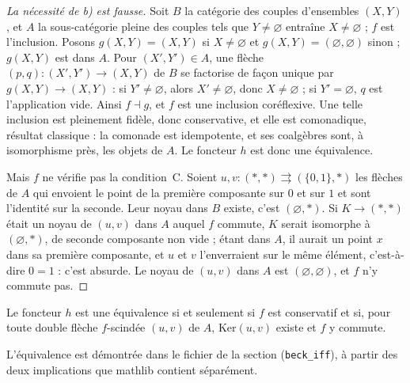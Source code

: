 \begin{proof}[La nécessité de b) est fausse]
Soit $B$ la catégorie des couples d'ensembles $(X, Y)$, et $A$ la sous-catégorie pleine des couples tels que $Y \neq \varnothing$ entraîne $X \neq \varnothing$ ; $f$ est l'inclusion. Posons $g(X, Y) = (X, Y)$ si $X \neq \varnothing$ et $g(X, Y) = (\varnothing, \varnothing)$ sinon ; $g(X, Y)$ est dans $A$. Pour $(X', Y') \in A$, une flèche $(p, q) : (X', Y') \to (X, Y)$ de $B$ se factorise de façon unique par $g(X, Y) \to (X, Y)$ : si $Y' \neq \varnothing$, alors $X' \neq \varnothing$, donc $X \neq \varnothing$ ; si $Y' = \varnothing$, $q$ est l'application vide. Ainsi $f \dashv g$, et $f$ est une inclusion coréflexive. Une telle inclusion est pleinement fidèle, donc conservative, et elle est comonadique, résultat classique : la comonade est idempotente, et ses coalgèbres sont, à isomorphisme près, les objets de $A$. Le foncteur $h$ est donc une équivalence.

Mais $f$ ne vérifie pas la condition~C. Soient $u, v : (\ast, \ast) \rightrightarrows (\{0, 1\}, \ast)$ les flèches de $A$ qui envoient le point de la première composante sur $0$ et sur $1$ et sont l'identité sur la seconde. Leur noyau dans $B$ existe, c'est $(\varnothing, \ast)$. Si $K \to (\ast, \ast)$ était un noyau de $(u, v)$ dans $A$ auquel $f$ commute, $K$ serait isomorphe à $(\varnothing, \ast)$, de seconde composante non vide ; étant dans $A$, il aurait un point $x$ dans sa première composante, et $u$ et $v$ l'enverraient sur le même élément, c'est-à-dire $0 = 1$ : c'est absurde. Le noyau de $(u, v)$ dans $A$ est $(\varnothing, \varnothing)$, et $f$ n'y commute pas.
\end{proof}

\begin{enonce}
Le foncteur $h$ est une équivalence si et seulement si $f$ est conservatif et si, pour toute double flèche $f$-scindée $(u, v)$ de $A$, $\mathrm{Ker}(u, v)$ existe et $f$ y commute.
\end{enonce}

\noindent L'équivalence est démontrée dans le fichier de la section (\texttt{beck\_iff}), à partir des deux implications que mathlib contient séparément.

